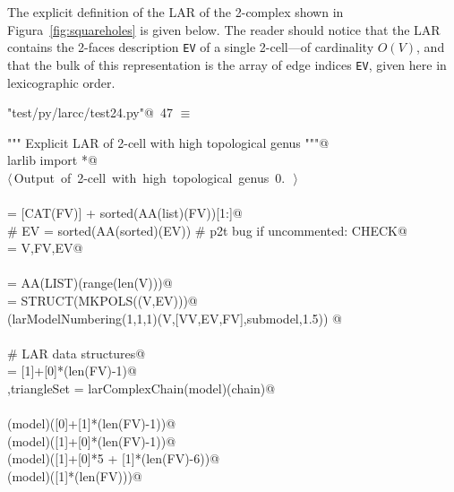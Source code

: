 \documentclass[11pt,oneside]{article}    %
\begin{document}
The explicit definition of the LAR of the 2-complex shown in Figura~\ref{fig:squareholes} is given below. The reader should notice that the LAR contains the 2-faces description \texttt{EV} of a single 2-cell---of cardinality $O(V)$, and that the bulk of this representation is the array of edge indices \texttt{EV}, given here in lexicographic order.

\begin{flushleft} \small \label{scrap78}
\protect{}\verb@"test/py/larcc/test24.py"@\nobreak\ {\footnotesize 47 }$\equiv$
\vspace{-1ex}
\begin{list}{}{} \item
\mbox{}\verb@""" Explicit LAR of 2-cell with high topological genus """@\\
\mbox{}\verb@from larlib import *@\\
\mbox{}\verb@@\hbox{$\langle\,$Output of 2-cell with high topological genus 0.\nobreak\ {\footnotesize {}}$\,\rangle$}\verb@@\\
\mbox{}\verb@@\\
\mbox{}\verb@FV = [CAT(FV)] + sorted(AA(list)(FV))[1:]@\\
\mbox{}\verb@# EV = sorted(AA(sorted)(EV))  # p2t bug if uncommented: CHECK@\\
\mbox{}\verb@model = V,FV,EV@\\
\mbox{}\verb@@\\
\mbox{}\verb@VV = AA(LIST)(range(len(V)))@\\
\mbox{}\verb@submodel = STRUCT(MKPOLS((V,EV)))@\\
\mbox{}\verb@VIEW(larModelNumbering(1,1,1)(V,[VV,EV,FV],submodel,1.5)) @\\
\mbox{}\verb@@\\
\mbox{}\verb@# LAR data structures@\\
\mbox{}\verb@chain = [1]+[0]*(len(FV)-1)@\\
\mbox{}\verb@outModel,triangleSet = larComplexChain(model)(chain)@\\
\mbox{}\verb@@\\
\mbox{}\verb@viewLarComplexChain(model)([0]+[1]*(len(FV)-1))@\\
\mbox{}\verb@viewLarComplexChain(model)([1]+[0]*(len(FV)-1))@\\
\mbox{}\verb@viewLarComplexChain(model)([1]+[0]*5 + [1]*(len(FV)-6))@\\
\mbox{}\verb@viewLarComplexChain(model)([1]*(len(FV)))@\\
\mbox{}\verb@@{\NWsep}
\end{list}
\vspace{-2ex}
\end{flushleft}
\end{document}
